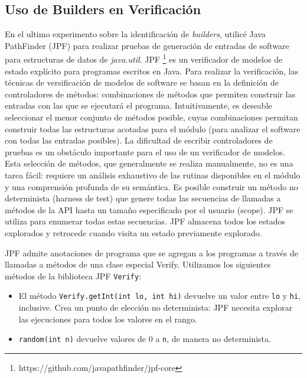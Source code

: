 \subsection{Uso de Builders en Verificación}

En el ultimo experimento sobre la identificación de \emph{builders}, utilicé Java PathFinder \cite{Visser:2005} (JPF) para realizar pruebas de generación de entradas de software para estructuras de datos de \emph{java.util}. JPF \footnote{https://github.com/javapathfinder/jpf-core}  es un verificador de modelos de estado explícito para programas escritos en Java. Para realizar la verificación, las técnicas de versificación de modelos de software se basan en la definición de controladores de métodos: combinaciones de métodos que permiten construir las entradas con las que se ejecutará el programa. Intuitivamente, es deseable seleccionar el menor conjunto de métodos posible, cuyas combinaciones permitan construir todas las estructuras acotadas para el módulo (para analizar el software con todas las entradas posibles). La dificultad de escribir controladores de pruebas es un obstáculo importante para el uso de un verificador de modelos. Esta selección de métodos, que generalmente se realiza manualmente, no es una tarea fácil: requiere un análisis exhaustivo de las rutinas disponibles en el módulo y una comprensión profunda de su semántica.
Es posible construir un método no determinista (harness de test) que genere todas las secuencias de llamadas a métodos de la API hasta un tamaño especificado por el usuario (scope). JPF se utiliza para enumerar todas estas secuencias. JPF almacena todos los estados explorados y retrocede cuando visita un estado previamente explorado.

JPF admite anotaciones de programa que se agregan a los programas a través de llamadas a métodos de una clase especial Verify.
Utilizamos los siguientes métodos de la biblioteca JPF \verb"Verify":
\vspace{5pt} 

\begin{itemize}
\item El método \verb"Verify.getInt(int lo, int hi)" devuelve un valor entre \verb"lo" y \verb"hi", inclusive. Crea un punto de elección no determinista: JPF necesita explorar las ejecuciones para todos los valores en el rango.
\item \verb"random(int n)" devuelve valores de 0 a \verb"n", de manera no determinista.
\end{itemize}

